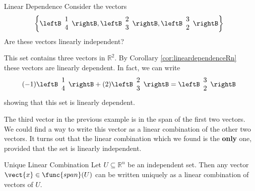\begin{example}{Linear Dependence}\label{exa:lineardependence}
Consider the vectors 
\[
\left\{ \leftB \begin{array}{r}
1 \\
4 
\end{array}
\rightB, 
\leftB \begin{array}{r}
2 \\
3
\end{array}
\rightB, 
\leftB \begin{array}{r}
3 \\
2
\end{array}
\rightB \right\}
\]
Are these vectors linearly independent?
\end{example}

\begin{solution}
This set contains three vectors in $\mathbb{R}^2$. By Corollary \ref{cor:lineardependenceRn} these vectors are linearly dependent.
In fact, we can write
\[
(-1) \leftB \begin{array}{r}
1 \\
4 
\end{array}
\rightB + (2) 
\leftB \begin{array}{r}
2 \\
3
\end{array}
\rightB = 
\leftB \begin{array}{r}
3 \\
2
\end{array}
\rightB
\]
showing that this set is linearly dependent. 
\end{solution}

The third vector in the previous example is in the span of the first two vectors. We could find a way to write this vector as a linear combination of the other two vectors. It turns out that the linear combination which we found is the \textbf{only} one, provided that the set is linearly independent. 

\begin{theorem}{Unique Linear Combination}\label{thm:uniquelinearcombination}
Let $U \subseteq\mathbb{R}^n$ be an independent set.
Then any vector $\vect{x}\in\func{span}(U)$ can be written uniquely as a linear combination of vectors of $U$.
\end{theorem}

